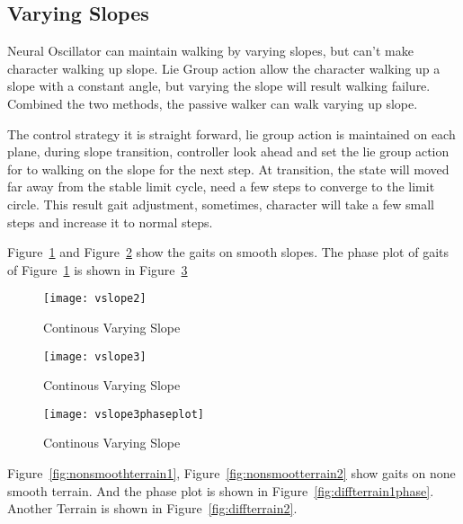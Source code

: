 \subsection{Varying Slopes}
Neural Oscillator can maintain walking by varying slopes, but can't make character walking up slope.
Lie Group action allow the character walking up a slope with a constant angle, but varying the slope will result walking failure.
Combined the two methods, the passive walker can walk varying up slope.


The control strategy it is straight forward, lie group action is maintained on each plane, during slope transition, controller look ahead and set the lie group action for to walking on the slope for the next step.
At transition, the state will moved far away from the stable limit cycle, need a few steps to converge to the limit circle.
This result gait adjustment, sometimes, character will take a few small steps and increase it to normal steps.


Figure~\ref{fig:vp1} and Figure~\ref{fig:vp2} show the gaits on smooth slopes.
The phase plot of gaits of Figure~\ref{fig:vp1} is shown in Figure~\ref{fig:vp2phas} 

\begin{figure}[!htbp]
  \begin{center}
      \texttt{[image: vslope2]}
    \caption{Continous Varying Slope}
    \label{fig:vp1}
\end{center}
\end{figure}


\begin{figure}[!htbp]
  \begin{center}
      \texttt{[image: vslope3]}
    \caption{Continous Varying Slope}
    \label{fig:vp2}
\end{center}
\end{figure}


\begin{figure}[!htbp]
  \begin{center}
      \texttt{[image: vslope3phaseplot]}
    \caption{Continous Varying Slope}
    \label{fig:vp2phas}
\end{center}
\end{figure}



Figure~\ref{fig:nonsmoothterrain1}, Figure~\ref{fig:nonsmootterrain2} show gaits on none smooth terrain.
And the phase plot is shown in Figure~\ref{fig:diffterrain1phase}.
Another Terrain is shown in Figure~\ref{fig:diffterrain2}.








